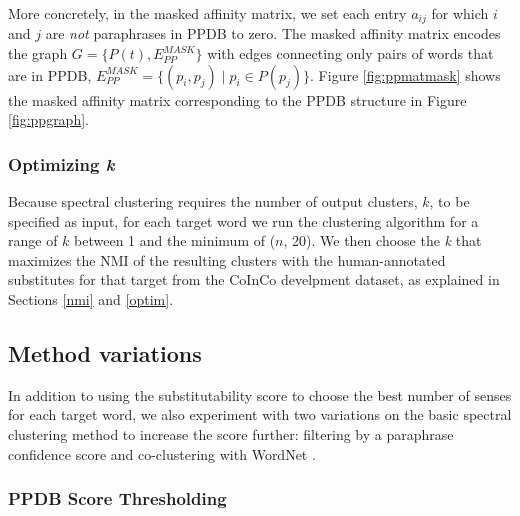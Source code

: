 \documentclass[11pt]{article}
\begin{document}
More concretely, in the masked affinity matrix, we set each entry $a_{ij}$ for which $i$ and $j$ are \textit{not} paraphrases in PPDB to zero. The masked affinity matrix encodes the graph $G = \{P(t), E_{PP}^{MASK}\}$ with edges connecting only pairs of words that are in PPDB, $E_{PP}^{MASK} = \{(p_i, p_j) \mid p_i \in P(p_j)\}$. Figure \ref{fig:ppmatmask} shows the masked affinity matrix corresponding to the PPDB structure in Figure \ref{fig:ppgraph}.

\subsubsection{Optimizing \textit{k}}
\label{optimk}

Because spectral clustering requires the number of output clusters, $k$, to be specified as input, for each target word we run the clustering algorithm for a range of $k$ between 1 and the minimum of ($n$,  20). We then choose the \textit{k} that maximizes the NMI of the resulting clusters with the human-annotated substitutes for that target from the CoInCo develpment dataset, as explained in Sections \ref{nmi} and \ref{optim}.

\subsection{Method variations}

In addition to using the substitutability score to choose the best number of senses for each target word, we also experiment with %
two variations on the basic spectral clustering method to increase the score further: filtering by a paraphrase confidence score and co-clustering with WordNet \cite{fellbaum98wordnet}. 


\subsubsection{PPDB Score Thresholding}
\end{document}
